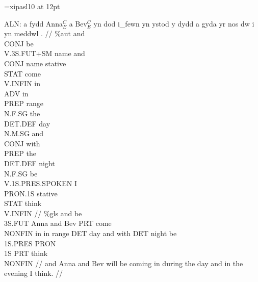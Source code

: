 \documentclass[12pt]{article}
\begin{document}
\font\ips=xipasl10 at 12pt
\def\dotsuff#1{{\scriptsize .#1}}

\ex
\begingl
\gla ALN:  a fydd Anna$^{C}_{E}$ a Bev$^{C}_{E}$ yn dod i\_fewn yn ystod y dydd a gyda yr nos dw i yn meddwl .  //
\glauto \%aut  and\\{CONJ} be\\{V.3S.FUT+SM} name and\\{CONJ} name stative\\{STAT} come\\{V.INFIN} in\\{ADV} in\\{PREP} range\\{N.F.SG} the\\{DET.DEF} day\\{N.M.SG} and\\{CONJ} with\\{PREP} the\\{DET.DEF} night\\{N.F.SG} be\\{V.1S.PRES.SPOKEN} I\\{PRON.1S} stative\\{STAT} think\\{V.INFIN}   //
\glmanual \%gls  and be\\{3S.FUT} Anna and Bev PRT come\\{NONFIN} in in range DET day and with DET night be\\{1S.PRES} PRON\\{1S} PRT think\\{NONFIN}   //
\glft and Anna and Bev will be coming in during the day and in the evening I think. //
\endgl
\xe
\end{document}
